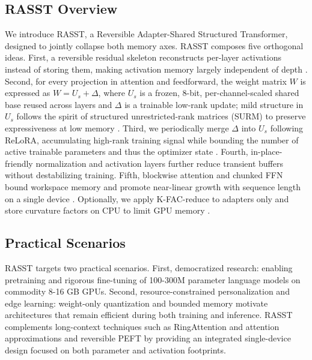 \documentclass{article}
\begin{document}
\subsection{RASST Overview}
We introduce RASST, a Reversible Adapter-Shared Structured Transformer, designed to jointly collapse both memory axes. RASST composes five orthogonal ideas. First, a reversible residual skeleton reconstructs per-layer activations instead of storing them, making activation memory largely independent of depth \cite{kitaev-2020-reformer}. Second, for every projection in attention and feedforward, the weight matrix \(W\) is expressed as \(W = U_s + \Delta\), where \(U_s\) is a frozen, 8-bit, per-channel-scaled shared base reused across layers and \(\Delta\) is a trainable low-rank update; mild structure in \(U_s\) follows the spirit of structured unrestricted-rank matrices (SURM) to preserve expressiveness at low memory \cite{sehanobish-2024-structured}. Third, we periodically merge \(\Delta\) into \(U_s\) following ReLoRA, accumulating high-rank training signal while bounding the number of active trainable parameters and thus the optimizer state \cite{lialin-2023-relora}. Fourth, in-place-friendly normalization and activation layers further reduce transient buffers without destabilizing training. Fifth, blockwise attention and chunked FFN bound workspace memory and promote near-linear growth with sequence length on a single device \cite{liu-2023-blockwise}. Optionally, we apply K-FAC-reduce to adapters only and store curvature factors on CPU to limit GPU memory \cite{eschenhagen-2023-kronecker}.

\subsection{Practical Scenarios}
RASST targets two practical scenarios. First, democratized research: enabling pretraining and rigorous fine-tuning of 100-300M parameter language models on commodity 8-16 GB GPUs. Second, resource-constrained personalization and edge learning: weight-only quantization and bounded memory motivate architectures that remain efficient during both training and inference. RASST complements long-context techniques such as RingAttention and attention approximations and reversible PEFT \cite{liao-2023-make} by providing an integrated single-device design focused on both parameter and activation footprints.
\end{document}
